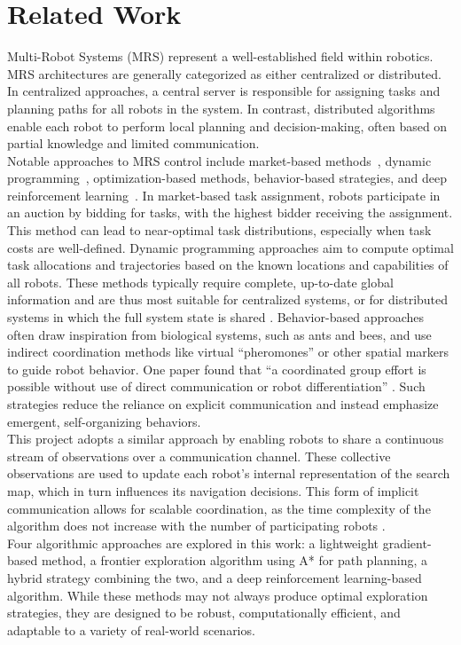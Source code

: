 \section{Related Work}
Multi-Robot Systems (MRS) represent a well-established field within robotics. MRS architectures are generally categorized as either centralized or distributed. In centralized approaches, a central server is responsible for assigning tasks and planning paths for all robots in the system. 
In contrast, distributed algorithms enable each robot to perform local planning and decision-making, often based on partial knowledge and limited communication. \\

Notable approaches to MRS control include market-based methods~\cite{trigui2014market}, dynamic programming~\cite{kato2011dp}, optimization-based methods, behavior-based strategies, and deep reinforcement learning~\cite{huttenrauch2019deep-swarm}. In market-based task assignment, robots participate in an auction by bidding for tasks, with the highest bidder receiving the assignment. This method can lead to near-optimal task distributions, especially when task costs are well-defined. Dynamic programming approaches aim to compute optimal task allocations and trajectories based on the known locations and capabilities of all robots. These methods typically require complete, up-to-date global information and are thus most suitable for centralized systems, or for distributed systems in which the full system state is shared \cite{multi-robot-search-moving-target}.
Behavior-based approaches often draw inspiration from biological systems, such as ants and bees, and use indirect coordination methods like virtual “pheromones” or other spatial markers to guide robot behavior. One paper found that “a coordinated group effort is possible without use of direct communication or robot differentiation” \cite{kube2000cooperative-ants}. Such strategies reduce the reliance on explicit communication and instead emphasize emergent, self-organizing behaviors. \\

This project adopts a similar approach by enabling robots to share a continuous stream of observations over a communication channel. These collective observations are used to update each robot’s internal representation of the search map, which in turn influences its navigation decisions. This form of implicit communication allows for scalable coordination, as the time complexity of the algorithm does not increase with the number of participating robots \cite{multi-robot-search-moving-target}.\\

Four algorithmic approaches are explored in this work: a lightweight gradient-based method, a frontier exploration algorithm using A* for path planning, a hybrid strategy combining the two, and a deep reinforcement learning-based algorithm. 
While these methods may not always produce optimal exploration strategies, they are designed to be robust, computationally efficient, and adaptable to a variety of real-world scenarios.
